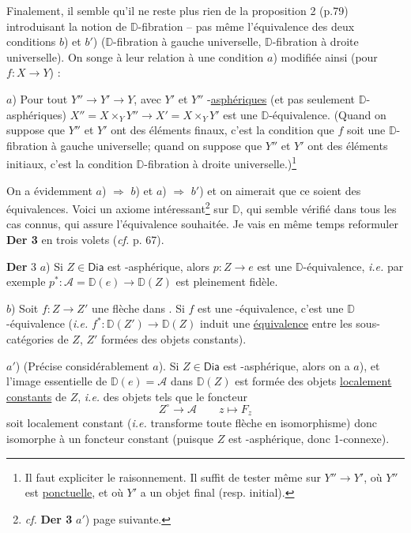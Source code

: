 \documentclass[11pt,leqno]{article}
\newcommand{\printedpage}[1]{\marginpar{\footnotesize p.~#1}}
\newcommand{\msp}[1]{\marginpar{\footnotesize [#1]}}
\newcommand{\DD}{\mathbb{D}}
\newcommand{\Dia}{\mathsf{Dia}}
\newcommand{\Hot}{\mathsf{Hot}}
\begin{document}
\printedpage{59}

\msp{page 96}
Finalement, il semble qu’il ne reste plus rien de la proposition 2 (p.79) introduisant la notion de $\DD$-fibration – pas même l’équivalence des deux conditions $b$) et $b'$) ($\DD$-fibration à gauche universelle, $\DD$-fibration à droite universelle). On songe à leur relation à une condition $a$) modifiée ainsi (pour $f : X \to Y$) :

$a$) Pour tout $Y'' \to Y' \to Y$, avec $Y'$ et $Y''$ \Hot-\underline{asphériques} (et pas seulement $\DD$-asphériques) $X'' = X \times_Y Y'' \to X' = X \times_Y Y'$ est une $\DD$-équivalence. (Quand on suppose que $Y''$ et $Y'$ ont des éléments finaux, c’est la condition que $f$ soit une $\DD$-fibration à gauche universelle; quand on suppose que $Y''$ et $Y'$ ont des éléments initiaux, c’est la condition $\DD$-fibration à droite universelle.)\footnote[48]{Il faut expliciter le raisonnement. Il suffit de tester même sur $Y'' \to Y'$, où $Y''$ est \underline{ponctuelle}, et où $Y'$ a un objet final (resp. initial).}

On a évidemment $a$) $\Rightarrow$ $b$) et $a$) $\Rightarrow$ $b'$) et on aimerait que ce soient des équivalences. Voici un axiome intéressant\footnote[49]{\textit{cf.} \textbf{Der 3} $a'$) page suivante.} sur $\DD$, qui semble vérifié dans tous les cas connus, qui assure l’équivalence souhaitée. Je vais en même temps reformuler \textbf{Der 3} en trois volets (\textit{cf.} p. 67).

\msp{page 97}
\textbf{Der} 3 $a$) Si $Z \in \Dia$ est \Hot-asphérique, alors $p : Z \to e$ est une $\DD$-équivalence, \textit{i.e.} par exemple $p^* : \mathcal{A} = \DD(e) \to \DD(Z)$ est pleinement fidèle.

$b$) Soit $f : Z \to Z'$ une flèche dans \Dia. Si $f$ est une \Hot-équivalence, c’est une $\DD$-équivalence (\textit{i.e.} $f^* : \DD(Z') \to \DD(Z)$ induit une \underline{équivalence} entre les sous-catégories de $Z$, $Z'$ formées des objets constants).

$a'$) (Précise considérablement $a$). Si $Z \in \Dia$ est \Hot-asphérique, alors on a $a$), et l’image essentielle de $\DD(e) = \mathcal{A}$ dans $\DD(Z)$ est formée des objets \underline{localement} \underline{constants} de $Z$, \textit{i.e.} des objets tels que le foncteur
\[
Z^{\circ} \longrightarrow \mathcal{A} \qquad z \longmapsto F_z
\]
soit localement constant (\textit{i.e.} transforme toute flèche en isomorphisme) donc isomorphe à un foncteur constant (puisque $Z$ est \Hot-asphérique, donc 1-connexe).
\end{document}
